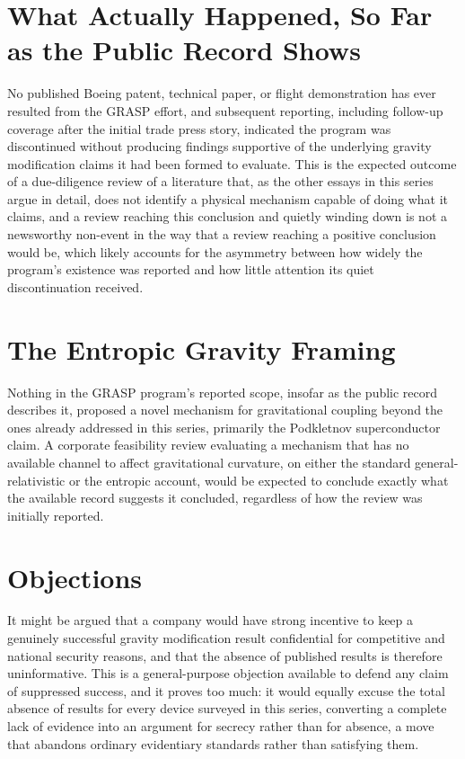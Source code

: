 \documentclass[11pt]{article}
\begin{document}
\section{What Actually Happened, So Far as the Public Record Shows}

No published Boeing patent, technical paper, or flight demonstration has ever resulted from the GRASP effort, and subsequent reporting, including follow-up coverage after the initial trade press story, indicated the program was discontinued without producing findings supportive of the underlying gravity modification claims it had been formed to evaluate. This is the expected outcome of a due-diligence review of a literature that, as the other essays in this series argue in detail, does not identify a physical mechanism capable of doing what it claims, and a review reaching this conclusion and quietly winding down is not a newsworthy non-event in the way that a review reaching a positive conclusion would be, which likely accounts for the asymmetry between how widely the program's existence was reported and how little attention its quiet discontinuation received.

\section{The Entropic Gravity Framing}

Nothing in the GRASP program's reported scope, insofar as the public record describes it, proposed a novel mechanism for gravitational coupling beyond the ones already addressed in this series, primarily the Podkletnov superconductor claim. A corporate feasibility review evaluating a mechanism that has no available channel to affect gravitational curvature, on either the standard general-relativistic or the entropic account, would be expected to conclude exactly what the available record suggests it concluded, regardless of how the review was initially reported.

\section{Objections}

It might be argued that a company would have strong incentive to keep a genuinely successful gravity modification result confidential for competitive and national security reasons, and that the absence of published results is therefore uninformative. This is a general-purpose objection available to defend any claim of suppressed success, and it proves too much: it would equally excuse the total absence of results for every device surveyed in this series, converting a complete lack of evidence into an argument for secrecy rather than for absence, a move that abandons ordinary evidentiary standards rather than satisfying them.
\end{document}
